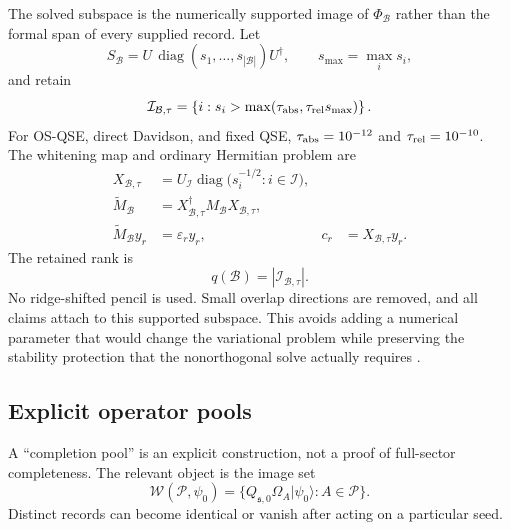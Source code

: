 \documentclass[
  reprint,
  amsmath,
  amssymb,
  aps,
  pra,
  nofootinbib,
  superscriptaddress,
  floatfix
]{revtex4-2}
\newcommand{\ket}[1]{|#1\rangle}
\begin{document}
The solved subspace is the numerically supported image of
$\Phi_{\mathcal B}$ rather than the formal span of every supplied record.  Let
\begin{equation}
 S_{\mathcal B}=U\,\operatorname{diag}(s_1,\ldots,s_{|\mathcal B|})U^\dagger,
 \qquad s_{\max}=\max_i s_i,
 \label{eq:overlap_eigendecomposition}
\end{equation}
and retain
\begin{equation}
 \mathcal I_{\mathcal B,\tau}
 =\left\{i:s_i>\max(\tau_{\rm abs},\tau_{\rm rel}s_{\max})\right\}.
 \label{eq:overlap_support}
\end{equation}
For OS-QSE, direct Davidson, and fixed QSE,
$\tau_{\rm abs}=10^{-12}$ and $\tau_{\rm rel}=10^{-10}$.  The whitening map
and ordinary Hermitian problem are
\begin{align}
 X_{\mathcal B,\tau}
 &=U_{\mathcal I}\operatorname{diag}
   \bigl(s_i^{-1/2}:i\in\mathcal I\bigr),
 \label{eq:supported_whitening}\\
 \widetilde M_{\mathcal B}
 &=X_{\mathcal B,\tau}^{\dagger}
   M_{\mathcal B}X_{\mathcal B,\tau},
 \nonumber\\
 \widetilde M_{\mathcal B}y_r&=\varepsilon_r y_r,
 &c_r&=X_{\mathcal B,\tau}y_r.
 \label{eq:supported_eigenproblem}
\end{align}
The retained rank is
\begin{equation}
 q(\mathcal B)=|\mathcal I_{\mathcal B,\tau}|.
 \label{eq:retained_rank}
\end{equation}
No ridge-shifted pencil is used.  Small overlap directions are removed, and
all claims attach to this supported subspace.  This avoids adding a numerical
parameter that would change the variational problem while preserving the
stability protection that the nonorthogonal solve actually requires
\cite{Epperly2022QSD,Lee2024SamplingQKSD,Getelina2024HardwareNoiseQSE}.

\subsection{Explicit operator pools}
\label{sec:operator_pools}

A ``completion pool'' is an explicit construction, not a proof of
full-sector completeness.  The relevant object is the image set
\begin{equation}
 \mathcal W(\mathcal P,\psi_0)
 =\{Q_{\mathfrak s,0}\Omega_A\ket{\psi_0}:A\in\mathcal P\}.
 \label{eq:pool_image_set}
\end{equation}
Distinct records can become identical or vanish after acting on a particular
seed.
\end{document}
